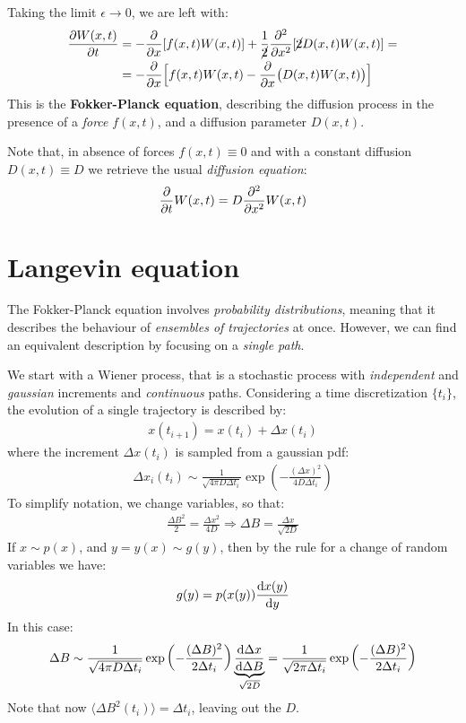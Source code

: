 \documentclass[../template.tex]{subfiles}
\begin{document}
Taking the limit $\epsilon \to 0$, we are left with:
\begin{align*}
    \pdv{W(x,t)}{t} &= -\pdv{x}[f(x,t) W(x,t)] + \frac{1}{\cancel{2}} \pdv[2]{x}[\cancel{2} D(x,t)W(x,t)] =\\
    &= - \pdv{x} \Big[f(x,t) W(x,t) - \pdv{x} \big(D(x,t) W(x,t)\big)\Big]  
\end{align*} 
This is the \textbf{Fokker-Planck equation}, describing the diffusion process in the presence of a \textit{force} $f(x,t)$, and a diffusion parameter $D(x,t)$.

Note that, in absence of forces $f(x,t) \equiv 0$ and with a constant diffusion $D(x,t) \equiv D$ we retrieve the usual \textit{diffusion equation}:
\begin{align*}
    \pdv{t} W(x,t) = D \pdv[2]{x}W(x,t)
\end{align*}     

\section{Langevin equation}
The Fokker-Planck equation involves \textit{probability distributions}, meaning that it describes the behaviour of \textit{ensembles of trajectories} at once. However, we can find an equivalent description by focusing on a \textit{single path}. 

We start with a Wiener process, that is a stochastic process with \textit{independent} and \textit{gaussian} increments and \textit{continuous} paths. Considering a time discretization $\{t_i\}$, the evolution of a single trajectory is described by:
\begin{align}
    x(t_{i+1}) = x(t_i) + \Delta x(t_i) \label{eqn:increment}
\end{align}
where the increment $\Delta x(t_i)$ is sampled from a gaussian pdf:
\begin{align*}
    \Delta x_i(t_i) \sim \frac{1}{\sqrt{4 \pi D \Delta t_i}} \exp\left(-\frac{(\Delta x)^2}{4 D \Delta t_i} \right) 
\end{align*}
To simplify notation, we change variables, so that:
\begin{align*}
    \frac{\Delta B^2}{2} = \frac{\Delta x^2}{4 D} \Rightarrow \Delta B = \frac{\Delta x}{\sqrt{2 D}}    
\end{align*}
If $x \sim p(x)$, and $y = y(x) \sim g(y)$, then by the rule for a change of random variables we have:
\begin{align*}
    g(y) = p(x(y)) \dv{x(y)}{y}(x(y))
\end{align*}
In this case:
\begin{align*}
    \Delta B \sim \frac{1}{\sqrt{4 \pi D \Delta t_i }} \exp\left(-\frac{(\Delta B)^2}{2 \Delta t_i} \right) \underbrace{\dv{\Delta x}{\Delta B}}_{\sqrt{2 D}} = \frac{1}{\sqrt{2 \pi \Delta t_i}} \exp\left(-\frac{(\Delta B)^2}{2 \Delta t_i} \right)  
\end{align*}
Note that now $\langle \Delta B^2(t_i) \rangle = \Delta t_i$, leaving out the $D$.
\end{document}

